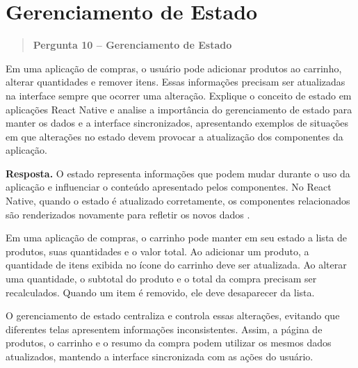 \documentclass[
    12pt,
    oneside,
    a4paper,
    brazil
]{abntex2}
\newcommand{\pergunta}[2]{%
\begin{quote}
\noindent\textbf{Pergunta #1 -- #2}
\end{quote}}
\newcommand{\resposta}{%
\par\noindent\textbf{Resposta.}\hspace{0.3em}
}
\begin{document}
\section{Gerenciamento de Estado}
\pergunta{10}{Gerenciamento de Estado}

Em uma aplicação de compras, o usuário pode adicionar produtos ao carrinho, alterar quantidades e remover itens. Essas informações precisam ser atualizadas na interface sempre que ocorrer uma alteração. Explique o conceito de estado em aplicações React Native e analise a importância do gerenciamento de estado para manter os dados e a interface sincronizados, apresentando exemplos de situações em que alterações no estado devem provocar a atualização dos componentes da aplicação.

\resposta O estado representa informações que podem mudar durante o uso da aplicação e influenciar o conteúdo apresentado pelos componentes. No React Native, quando o estado é atualizado corretamente, os componentes relacionados são renderizados novamente para refletir os novos dados \cite{reactState}.

Em uma aplicação de compras, o carrinho pode manter em seu estado a lista de produtos, suas quantidades e o valor total. Ao adicionar um produto, a quantidade de itens exibida no ícone do carrinho deve ser atualizada. Ao alterar uma quantidade, o subtotal do produto e o total da compra precisam ser recalculados. Quando um item é removido, ele deve desaparecer da lista.

O gerenciamento de estado centraliza e controla essas alterações, evitando que diferentes telas apresentem informações inconsistentes. Assim, a página de produtos, o carrinho e o resumo da compra podem utilizar os mesmos dados atualizados, mantendo a interface sincronizada com as ações do usuário.


\end{document}
